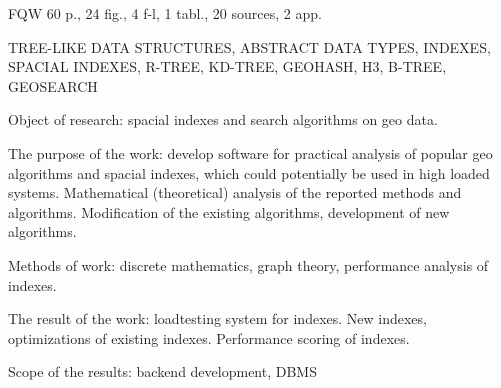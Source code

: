 \ReferatEN

FQW 60 p., 24 fig., 4 f-l, 1 tabl., 20 sources, 2 app.

\noindent TREE-LIKE DATA STRUCTURES, ABSTRACT DATA TYPES, INDEXES, SPACIAL INDEXES, R-TREE, KD-TREE, GEOHASH, H3, B-TREE, GEOSEARCH


Object of research: spacial indexes and search algorithms on geo data.

The purpose of the work: develop software for practical analysis of popular geo algorithms and spacial indexes, which could potentially be used in high loaded systems. Mathematical (theoretical) analysis of the reported methods and algorithms. Modification of the existing algorithms, development of new algorithms. 

Methods of work: discrete mathematics, graph theory, performance analysis of indexes.

The result of the work: loadtesting system for indexes. New indexes, optimizations of existing indexes. Performance scoring of indexes.

Scope of the results: backend development, DBMS



